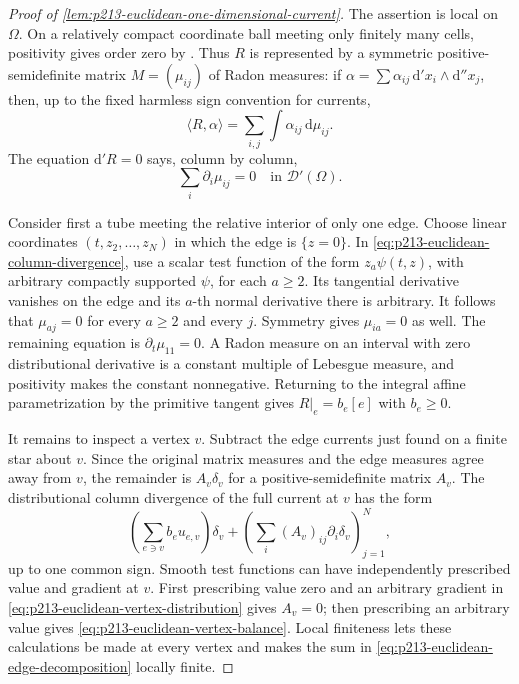 \begin{proof}[Proof of
\cref{lem:p213-euclidean-one-dimensional-current}]
The assertion is local on $\Omega$.  On a relatively compact coordinate
ball meeting only finitely many cells, positivity gives order zero by
\cite[Proposition~7.2.9]{CLD25}.  Thus $R$ is represented by a symmetric
positive-semidefinite matrix $M=(\mu_{ij})$ of Radon measures: if
$\alpha=\sum\alpha_{ij}\,\mathrm d'x_i\wedge\mathrm d''x_j$, then, up to
the fixed harmless sign convention for currents,
\[
                         \langle R,\alpha\rangle
                    =\sum_{i,j}\int\alpha_{ij}\,\mathrm d\mu_{ij}.
\]
The equation $\mathrm d'R=0$ says, column by column,
\begin{equation}
                         \sum_i\partial_i\mu_{ij}=0
                 \quad\text{in }\mathcal D'(\Omega).
 \label{eq:p213-euclidean-column-divergence}
\end{equation}

Consider first a tube meeting the relative interior of only one edge.
Choose linear coordinates $(t,z_2,\ldots,z_N)$ in which the edge is
$\{z=0\}$.  In
\eqref{eq:p213-euclidean-column-divergence}, use a scalar test function of
the form $z_a\psi(t,z)$, with arbitrary compactly supported $\psi$, for
each $a\geq2$.  Its tangential derivative vanishes on the edge and its
$a$-th normal derivative there is arbitrary.  It follows that
$\mu_{aj}=0$ for every $a\geq2$ and every $j$.  Symmetry gives
$\mu_{ia}=0$ as well.  The remaining equation is
$\partial_t\mu_{11}=0$.  A Radon measure on an interval with zero
distributional derivative is a constant multiple of Lebesgue measure,
and positivity makes the constant nonnegative.  Returning to the integral
affine parametrization by the primitive tangent gives
$R|_e=b_e[e]$ with $b_e\geq0$.

It remains to inspect a vertex $v$.  Subtract the edge currents just found
on a finite star about $v$.  Since the original matrix measures and the
edge measures agree away from $v$, the remainder is
$A_v\delta_v$ for a positive-semidefinite matrix $A_v$.  The distributional
column divergence of the full current at $v$ has the form
\begin{equation}
 \left(\sum_{e\ni v}b_eu_{e,v}\right)\delta_v
       +\left(\sum_i(A_v)_{ij}\partial_i\delta_v\right)_{j=1}^N,
 \label{eq:p213-euclidean-vertex-distribution}
\end{equation}
up to one common sign.  Smooth test functions can have independently
prescribed value and gradient at $v$.  First prescribing value zero and an
arbitrary gradient in
\eqref{eq:p213-euclidean-vertex-distribution} gives $A_v=0$; then
prescribing an arbitrary value gives
\eqref{eq:p213-euclidean-vertex-balance}.  Local finiteness lets these
calculations be made at every vertex and makes the sum in
\eqref{eq:p213-euclidean-edge-decomposition} locally finite.
\end{proof}

